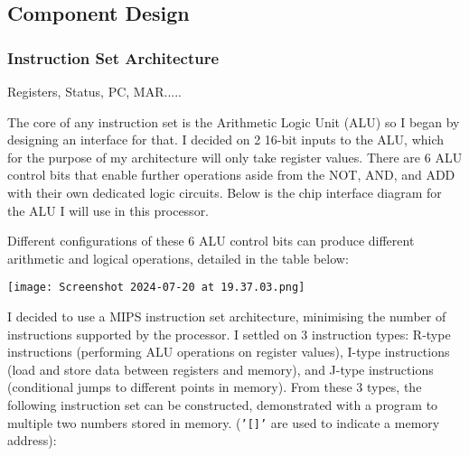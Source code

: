 \bigskip


\subsection{Component Design}
\subsubsection{Instruction Set Architecture}

Registers, Status, PC, MAR.....

\label{sec:ISADesign}
The core of any instruction set is the Arithmetic Logic Unit (ALU) so I began by designing an interface for that. I decided on 2 16-bit inputs to the ALU, which for the purpose of my architecture will only take register values. There are 6 ALU control bits that enable further operations aside from the NOT, AND, and ADD with their own dedicated logic circuits. Below is the chip interface diagram for the ALU I will use in this processor.

\bigskip


\bigskip

Different configurations of these 6 ALU control bits can produce different arithmetic and logical operations, detailed in the table below:

\texttt{[image: Screenshot 2024-07-20 at 19.37.03.png]}



I decided to use a MIPS instruction set architecture, minimising the number of instructions supported by the processor. I settled on 3 instruction types: R-type instructions (performing ALU operations on register values), I-type instructions (load and store data between registers and memory), and J-type instructions (conditional jumps to different points in memory). From these 3 types, the following instruction set can be constructed, demonstrated with a program to multiple two numbers stored in memory. (\texttt{'[]'} are used to indicate a memory address):

